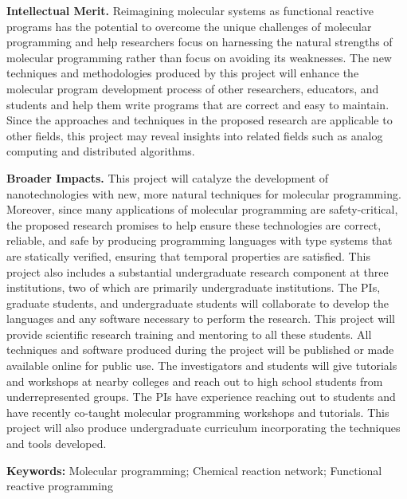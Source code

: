 \documentclass[11pt]{article}
\begin{document}
    \textbf{Intellectual Merit.}
    Reimagining molecular systems as functional reactive programs has the potential to overcome the unique challenges of molecular programming and help researchers focus on harnessing the natural strengths of molecular programming rather than focus on avoiding its weaknesses.
    The new techniques and methodologies produced by this project will enhance the molecular program development process of other researchers, educators, and students and help them write programs that are correct and easy to maintain.
    Since the approaches and techniques in the proposed research are applicable to other fields, this project may reveal insights into related fields such as analog computing and distributed algorithms.

    \textbf{Broader Impacts.}
    This project will catalyze the development of nanotechnologies with new, more natural techniques for molecular programming.
    Moreover, since many applications of molecular programming are safety-critical, the proposed research promises to help ensure these technologies are correct, reliable, and safe by producing programming languages with type systems that are statically verified, ensuring that temporal properties are satisfied.
    This project also includes a substantial undergraduate research component at three institutions, two of which are primarily undergraduate institutions.
    The PIs, graduate students, and undergraduate students will collaborate to develop the languages and any software necessary to perform the research.
    This project will provide scientific research training and mentoring to all these students.
    All techniques and software produced during the project will be published or made available online for public use.
    The investigators and students will give tutorials and workshops at nearby colleges and reach out to high school students from underrepresented groups.
    The PIs have experience reaching out to students and have recently co-taught molecular programming workshops and tutorials.
    This project will also produce undergraduate curriculum incorporating the techniques and tools developed.

    \textbf{Keywords:}
    Molecular programming;
    Chemical reaction network;
    Functional reactive programming
\end{document}
